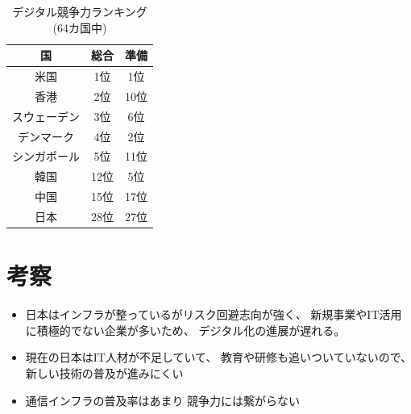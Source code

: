 \documentclass[a4paper,11pt,dvipdfmx]{ujarticle}
\begin{document}
\begin{table}[htbp]
    \centering
    \caption{デジタル競争力ランキング(64カ国中)}\label{表1}
    \begin{tabular}{|c|c|c|}
        \hline
        国 & 総合 & 準備 \\
        \hline
        米国 & 1位 & 1位 \\
        \hline
        香港 & 2位 & 10位 \\
        \hline
        スウェーデン & 3位 & 6位 \\
        \hline
        デンマーク & 4位 & 2位 \\
        \hline
        シンガポール & 5位 & 11位 \\
        \hline
        \hline
            韓国    & 12位 & 5位 \\
        \hline
            中国    & 15位 & 17位 \\
        \hline
        \hline
        日本 & 28位 & 27位 \\
        \hline
    \end{tabular}
\end{table}
\section{考察}
\begin{itemize}
    \item{日本はインフラが整っているがリスク回避志向が強く、
    新規事業やIT活用に積極的でない企業が多いため、
    デジタル化の進展が遅れる。}
    \item{現在の日本はIT人材が不足していて、
    教育や研修も追いついていないので、
    新しい技術の普及が進みにくい}
    \item{通信インフラの普及率はあまり
    競争力には繋がらない}
\end{itemize}



\end{document}
